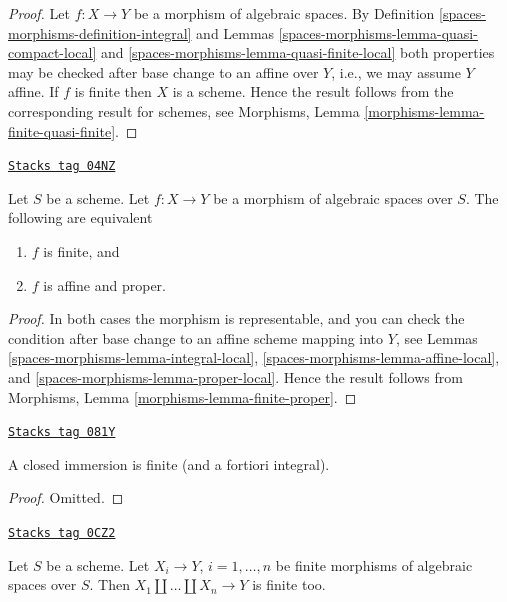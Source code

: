 \begin{proof}
Let $f : X \to Y$ be a morphism of algebraic spaces.
By
Definition \ref{spaces-morphisms-definition-integral}
and
Lemmas \ref{spaces-morphisms-lemma-quasi-compact-local} and
\ref{spaces-morphisms-lemma-quasi-finite-local}
both properties may be checked after base change to an affine over $Y$,
i.e., we may assume $Y$ affine.
If $f$ is finite then $X$ is a scheme.
Hence the result follows from the corresponding result for schemes, see
Morphisms, Lemma \ref{morphisms-lemma-finite-quasi-finite}.
\end{proof}

\begin{lemma}
\label{spaces-morphisms-lemma-finite-proper}
\href{https://stacks.math.columbia.edu/tag/04NZ}{\texttt{Stacks tag 04NZ}}

Let $S$ be a scheme. Let $f : X \to Y$ be a morphism of algebraic spaces over
$S$. The following are equivalent
\begin{enumerate}
\item $f$ is finite, and
\item $f$ is affine and proper.
\end{enumerate}
\end{lemma}

\begin{proof}
In both cases the morphism is representable, and you can check the condition
after base change to an affine scheme mapping into $Y$, see
Lemmas \ref{spaces-morphisms-lemma-integral-local}, \ref{spaces-morphisms-lemma-affine-local}, and
\ref{spaces-morphisms-lemma-proper-local}. Hence the result follows from
Morphisms, Lemma \ref{morphisms-lemma-finite-proper}.
\end{proof}

\begin{lemma}
\label{spaces-morphisms-lemma-closed-immersion-finite}
\href{https://stacks.math.columbia.edu/tag/081Y}{\texttt{Stacks tag 081Y}}

A closed immersion is finite (and a fortiori integral).
\end{lemma}

\begin{proof}
Omitted.
\end{proof}

\begin{lemma}
\label{spaces-morphisms-lemma-finite-union-finite}
\href{https://stacks.math.columbia.edu/tag/0CZ2}{\texttt{Stacks tag 0CZ2}}

Let $S$ be a scheme.
Let $X_i \to Y$, $i = 1, \ldots, n$ be finite morphisms of
algebraic spaces over $S$.
Then $X_1 \amalg \ldots \amalg X_n \to Y$ is finite too.
\end{lemma}

